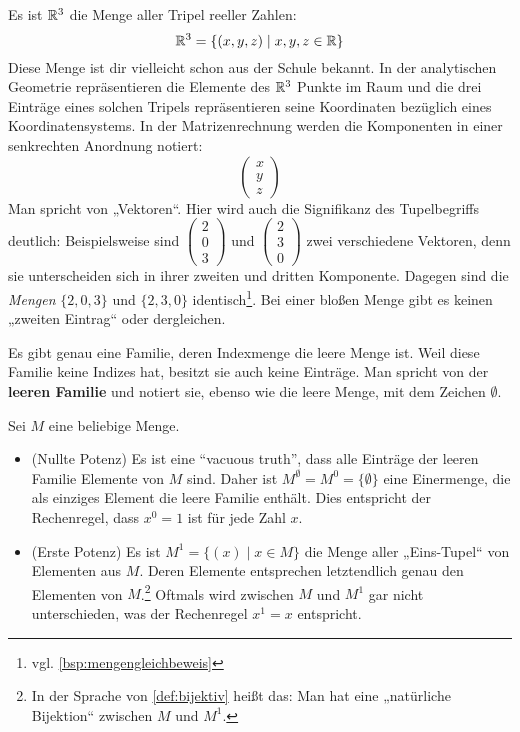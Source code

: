 \begin{bsp}
    Es ist $\mathbb R^3$ die Menge aller Tripel reeller Zahlen:
        \[ \mathbb R^3 = \{(x,y,z) \mid x,y,z\in \mathbb R \} \]
    Diese Menge ist dir vielleicht schon aus der Schule bekannt. In der analytischen Geometrie repräsentieren die Elemente des $\mathbb R^3$ Punkte im Raum und die drei Einträge eines solchen Tripels repräsentieren seine Koordinaten bezüglich eines Koordinatensystems. In der Matrizenrechnung werden die Komponenten in einer senkrechten Anordnung notiert:
    \[\begin{pmatrix}
        x \\ y \\ z 
    \end{pmatrix} \]
    Man spricht von „Vektoren“. Hier wird auch die Signifikanz des Tupelbegriffs deutlich: Beispielsweise sind $\begin{pmatrix} 2 \\ 0 \\ 3 \end{pmatrix}$ und $\begin{pmatrix} 2 \\ 3 \\ 0 \end{pmatrix}$ zwei verschiedene Vektoren, denn sie unterscheiden sich in ihrer zweiten und dritten Komponente. Dagegen sind die \emph{Mengen} $\{2,0,3\}$ und $\{2,3,0\}$ identisch\footnote{vgl. \cref{bsp:mengengleichbeweis}}. Bei einer bloßen Menge gibt es keinen „zweiten Eintrag“ oder dergleichen.
\end{bsp}


\begin{defin} \label{def:leerefam}
    Es gibt genau eine Familie, deren Indexmenge die leere Menge ist. Weil diese Familie keine Indizes hat, besitzt sie auch keine Einträge. Man spricht von der \textbf{leeren Familie} und notiert sie, ebenso wie die leere Menge, mit dem Zeichen $\emptyset$.
\end{defin}


\begin{bem}
    Sei $M$ eine beliebige Menge.
    \begin{itemize}
        \item(Nullte Potenz) Es ist eine ``vacuous truth'', dass alle Einträge der leeren Familie Elemente von $M$ sind. Daher ist $M^\emptyset=M^0 = \{\emptyset\}$ eine Einermenge, die als einziges Element die leere Familie enthält. Dies entspricht der Rechenregel, dass $x^0=1$ ist für jede Zahl $x$.
        \item(Erste Potenz) Es ist $M^1 = \{(x)\mid x\in M\}$ die Menge aller „Eins-Tupel“ von Elementen aus $M$. Deren Elemente entsprechen letztendlich genau den Elementen von $M$.\footnote{In der Sprache von \cref{def:bijektiv} heißt das: Man hat eine „natürliche Bijektion“ zwischen $M$ und $M^1$.} Oftmals wird zwischen $M$ und $M^1$ gar nicht unterschieden, was der Rechenregel $x^1=x$ entspricht.
    \end{itemize}
\end{bem}





